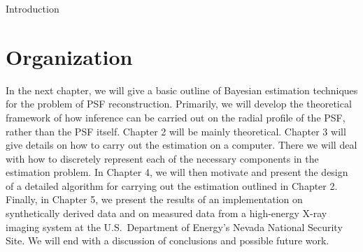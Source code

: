 \begin{chapter}{Introduction}
\section{Organization}
  In the next chapter, we will give a basic outline of Bayesian estimation techniques for the problem of PSF reconstruction.
  Primarily, we will develop the theoretical framework of how inference can be carried out on the radial profile of the PSF, rather than the PSF itself.
  Chapter 2 will be mainly theoretical.
  Chapter 3 will give details on how to carry out the estimation on a computer.
  There we will deal with how to discretely represent each of the necessary components in the estimation problem.
  In Chapter 4, we will then motivate and present the design of a detailed algorithm for carrying out the estimation outlined in Chapter 2.
  Finally, in Chapter 5, we present the results of an implementation on synthetically derived data and on measured data from a high-energy X-ray imaging system at the U.S.~Department of Energy's Nevada National Security Site.
  We will end with a discussion of conclusions and possible future work.


\begin{figure}
  \begin{center}
\end{center}
\end{figure}
\end{chapter}
